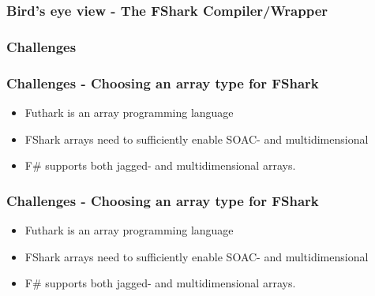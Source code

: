 \documentclass[10pt, compress, usenames, dvipsnames]{beamer}
\begin{document}
\begin{frame}[fragile]
  \frametitle{Bird's eye view - The FShark Compiler/Wrapper}

\end{frame}
\begin{frame}[fragile]
  \frametitle{Challenges}

\end{frame}

\begin{frame}[fragile]
  \frametitle{Challenges - Choosing an array type for FShark}
  \begin{itemize}
  \item <1-> Futhark is an array programming language
  \item <2-> FShark arrays need to sufficiently enable SOAC- and multidimensional
  \item <3-> F\# supports both jagged- and multidimensional arrays.
  \end{itemize}
\end{frame}
\begin{frame}[fragile]
  \frametitle{Challenges - Choosing an array type for FShark}
  \begin{itemize}
  \item <1-> Futhark is an array programming language
  \item <2-> FShark arrays need to sufficiently enable SOAC- and multidimensional
  \item <3-> F\# supports both jagged- and multidimensional arrays.
  \end{itemize}
\end{frame}
\end{document}
